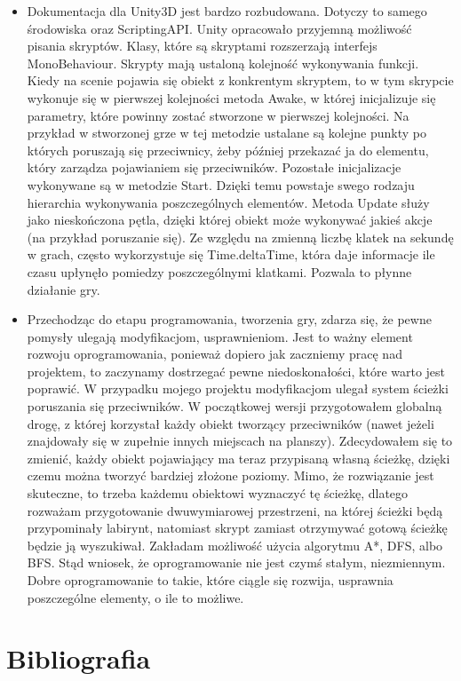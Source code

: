 \documentclass[a4paper,12pt, twoside, titlepage]{article}
\begin{document}
\begin{itemize}
	\item Dokumentacja dla Unity3D jest bardzo rozbudowana. Dotyczy to samego środowiska oraz ScriptingAPI. Unity opracowało przyjemną możliwość pisania skryptów. Klasy, które są skryptami rozszerzają interfejs MonoBehaviour. Skrypty mają ustaloną kolejność wykonywania funkcji.  Kiedy na scenie pojawia się obiekt z konkrentym skryptem, to w tym skrypcie wykonuje się w pierwszej kolejności metoda Awake, w której inicjalizuje się parametry, które powinny zostać stworzone w pierwszej kolejności. Na przykład w stworzonej grze w tej metodzie ustalane są kolejne punkty po których poruszają się przeciwnicy, żeby później przekazać ja do elementu, który zarządza pojawianiem się przeciwników. Pozostałe inicjalizacje wykonywane są w metodzie Start. Dzięki temu powstaje swego rodzaju hierarchia wykonywania poszczególnych elementów. Metoda Update służy jako nieskończona pętla, dzięki której obiekt może wykonywać jakieś akcje (na przykład poruszanie się). Ze względu na zmienną liczbę klatek na sekundę w grach, często wykorzystuje się Time.deltaTime, która daje informacje ile czasu upłynęło pomiedzy poszczególnymi klatkami. Pozwala to płynne działanie gry.
	
	\item Przechodząc do etapu programowania, tworzenia gry, zdarza się, że pewne pomysły ulegają modyfikacjom, usprawnieniom. Jest to ważny element rozwoju oprogramowania, ponieważ dopiero jak zaczniemy pracę nad projektem, to zaczynamy dostrzegać pewne niedoskonałości, które warto jest poprawić. W przypadku mojego projektu modyfikacjom ulegał system ścieżki poruszania się przeciwników. W początkowej wersji przygotowałem globalną drogę, z której korzystał każdy obiekt tworzący przeciwników (nawet jeżeli znajdowały się w zupełnie innych miejscach na planszy). Zdecydowałem się to zmienić, każdy obiekt pojawiający ma teraz przypisaną własną ścieżkę, dzięki czemu można tworzyć bardziej złożone poziomy. Mimo, że rozwiązanie jest skuteczne, to trzeba każdemu obiektowi wyznaczyć tę ścieżkę, dlatego rozważam przygotowanie dwuwymiarowej przestrzeni, na której ścieżki będą przypominały labirynt, natomiast skrypt zamiast otrzymywać gotową ścieżkę będzie ją wyszukiwał. Zakładam możliwość użycia algorytmu A*, DFS, albo BFS. Stąd wniosek, że oprogramowanie nie jest czymś stałym, niezmiennym. Dobre oprogramowanie to takie, które ciągle się rozwija, usprawnia poszczególne elementy, o ile to możliwe.
\end{itemize}
 
\newpage
\section{Bibliografia}
\end{document}

